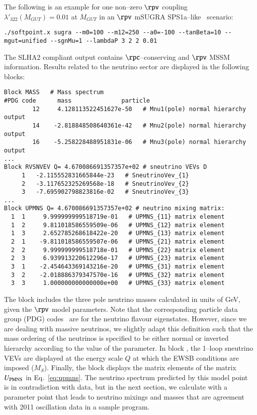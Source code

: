 \documentclass[pdflatex,final,3p,times]{elsarticle}
\begin{document}
The following is an example for one non--zero $\rpv$ coupling
$\lambda'_{322}(M_{GUT})=0.01$ at $M_{GUT}$ in an $\rpv$ mSUGRA
SPS1a--like~\cite{Allanach:2002nj} scenario:
\small
\begin{verbatim}
./softpoint.x sugra --m0=100 --m12=250 --a0=-100 --tanBeta=10 --mgut=unified --sgnMu=1 --lambdaP 3 2 2 0.01
\end{verbatim}
\normalsize The SLHA2 compliant output contains $\rpc$--conserving and
$\rpv$ MSSM information.  Results related to the neutrino
sector are displayed in the following blocks:
\begin{verbatim}
Block MASS   # Mass spectrum
#PDG code      mass              particle
        12     4.128113522451627e-50   # Mnu1(pole) normal hierarchy output
        14    -2.818848508640361e-42   # Mnu2(pole) normal hierarchy output
        16    -5.258228488951831e-06   # Mnu3(pole) normal hierarchy output
...
Block RVSNVEV Q= 4.670086691357357e+02 # sneutrino VEVs D 
     1   -2.115552831665844e-23   # SneutrinoVev_{1}
     2   -3.117652325269568e-18   # SneutrinoVev_{2}
     3   -7.695902798823816e-02   # SneutrinoVev_{3}
...
Block UPMNS Q= 4.670086691357357e+02 # neutrino mixing matrix:
  1  1     9.999999999518719e-01   # UPMNS_{11} matrix element
  1  2     9.811018586559509e-06   # UPMNS_{12} matrix element
  1  3     2.652785268618422e-20   # UPMNS_{13} matrix element
  2  1    -9.811018586559507e-06   # UPMNS_{21} matrix element
  2  2     9.999999999518718e-01   # UPMNS_{22} matrix element
  2  3     6.939913220612296e-17   # UPMNS_{23} matrix element
  3  1    -2.454643369143216e-20   # UPMNS_{31} matrix element
  3  2    -2.018886379347570e-16   # UPMNS_{32} matrix element
  3  3     1.000000000000000e+00   # UPMNS_{33} matrix element
\end{verbatim}
The block  includes the three pole neutrino masses
calculated in units of GeV, given the $\rpv$ model parameters.
Note that the corresponding particle data group (PDG) codes~\cite{pdg} are for
the 
neutrino flavour eigenstates. However, since we  
are dealing with massive neutrinos, we slightly adapt this definition such that the mass ordering of the
neutrinos is specified to be either normal or inverted hierarchy according to the value of the 
 parameter.
In block , the 1--loop sneutrino VEVs are displayed at the energy scale $Q$ at which 
the EWSB conditions are imposed ($M_S$).
 Finally, the block  displays the matrix elements of the matrix
$U_{\rm PMNS}$ in Eq.~\ref{eq:upmns}.
The neutrino spectrum predicted by this model point is in
contradiction with data, but in the next section, we calculate with
a parameter point that leads to neutrino mixings and masses that are agreement
with 2011 oscillation data
in a sample program. 
\end{document}

